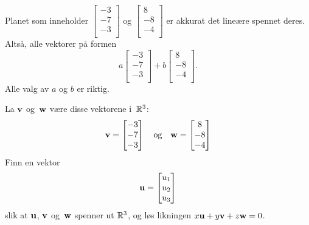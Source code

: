 \begin{losning}
Planet som inneholder 
$
\begin{bmatrix}
-3  \\
-7 \\
-3 \\
\end{bmatrix}$ og $\begin{bmatrix}
8  \\
-8 \\
-4 \\
\end{bmatrix}
$ er akkurat det lineære spennet deres. Altså, alle vektorer på formen 
\[
a\begin{bmatrix}
-3  \\
-7 \\
-3 \\
\end{bmatrix} + b\begin{bmatrix}
8  \\
-8 \\
-4 \\
\end{bmatrix}.
\] Alle valg av $a$ og $b$ er riktig.
\end{losning}





\begin{oppgave}
La $\mathbf{v}$ og~$\mathbf{w}$ være disse vektorene i~$\mathbb{R}^3$:
\[
	\mathbf{v}=
	\begin{bmatrix}
	-3  \\
	-7 \\
	-3 \\
	\end{bmatrix}
	\quad\text{og}\quad
	\mathbf{w}=
	\begin{bmatrix}
	8  \\
	-8 \\
	-4 \\
	\end{bmatrix}
\]
	Finn en vektor 
\[
	\mathbf{u}=\begin{bmatrix}
	u_1    \\
	u_2 \\
	u_3  
	\end{bmatrix}
\]
slik at $\mathbf{u}$, $\mathbf{v}$ og~$\mathbf{w}$
	spenner ut $\mathbb{R}^3$, og løs likningen $x\mathbf{u}+y\mathbf{v}+z\mathbf{w}=0$.
\end{oppgave}


